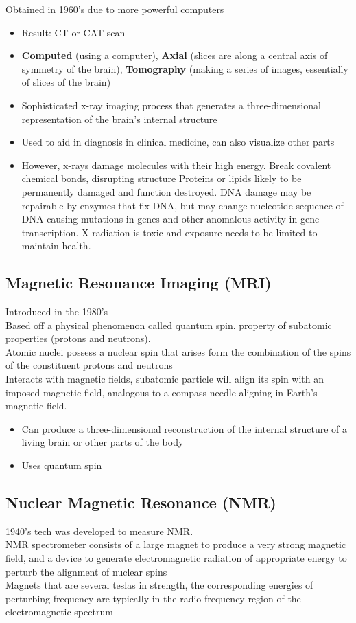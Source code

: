 \documentclass{article}
\begin{document}
Obtained in 1960's due to more powerful computers 
\begin{itemize}
    \item Result: CT or CAT scan
    \item \textbf{Computed} (using a computer), \textbf{Axial} (slices are along a central axis of symmetry of the brain), \textbf{Tomography} (making a series of images, essentially of slices of the brain)
    \item Sophisticated x-ray imaging process that generates a three-dimensional representation of the brain's internal structure
    \item Used to aid in diagnosis in clinical medicine, can also visualize other parts
    \item However, x-rays damage molecules with their high energy. 
        \subitem Break covalent chemical bonds, disrupting structure
        \subitem Proteins or lipids likely to be permanently damaged and function destroyed. 
        \subitem DNA damage may be repairable by enzymes that fix DNA, but may change nucleotide sequence of DNA causing mutations in genes and other anomalous activity in gene transcription.
        \subitem X-radiation is toxic and exposure needs to be limited to maintain health. 
\end{itemize}


\subsection{Magnetic Resonance Imaging (MRI)}
Introduced in the 1980's \\
Based off a physical phenomenon called quantum spin. property of subatomic properties (protons and neutrons). \\
Atomic nuclei possess a nuclear spin that arises form the combination of the spins of the constituent protons and neutrons \\
Interacts with magnetic fields, subatomic particle will align its spin with an imposed magnetic field, analogous to a compass needle aligning in Earth's magnetic field. 
\begin{itemize}
    \item Can produce a three-dimensional reconstruction of the internal structure of a living brain or other parts of the body
    \item Uses quantum spin
\end{itemize}

\subsection{Nuclear Magnetic Resonance (NMR)}
1940's tech was developed to measure NMR. \\
NMR spectrometer consists of a large magnet to produce a very strong magnetic field, and a device to generate electromagnetic radiation of appropriate energy to perturb the alignment of nuclear spins \\
Magnets that are several teslas in strength, the corresponding energies of perturbing frequency are typically in the radio-frequency region of the electromagnetic spectrum \\
\end{document}
